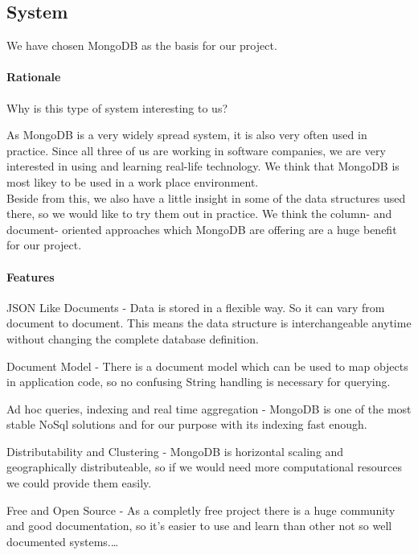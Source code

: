 \subsection{System}

We have chosen MongoDB as the basis for our project.

\paragraph{Rationale} Why is this type of system interesting to us? 

As MongoDB is a very widely spread system, it is also very often used in practice. Since all three of us are working in software companies, we are very interested in using and learning real-life technology. We think that MongoDB is most likey to be used in a work place environment. \\ 

Beside from this, we also have a little insight in some of the data structures used there, so we would like to try them out in practice. We think the column- and document- oriented approaches which MongoDB are offering are a huge benefit for our project.

\paragraph{Features} 

\begin{packed_enum}
    \item JSON Like Documents - Data is stored in a flexible way. So it can vary from document to document. This means the data structure is interchangeable anytime without changing the complete database definition.
    \item Document Model - There is a document model which can be used to map objects in application code, so no confusing String handling is necessary for querying.
    \item Ad hoc queries, indexing and real time aggregation - MongoDB is one of the most stable NoSql solutions and for our purpose with its indexing fast enough.
    \item Distributability and Clustering - MongoDB is horizontal scaling and geographically distributeable, so if we would need more computational resources we could provide them easily. 
    \item Free and Open Source - As a completly free project there is a huge community and good documentation, so it's easier to use and learn than other not so well documented systems.\ldots
\end{packed_enum}

